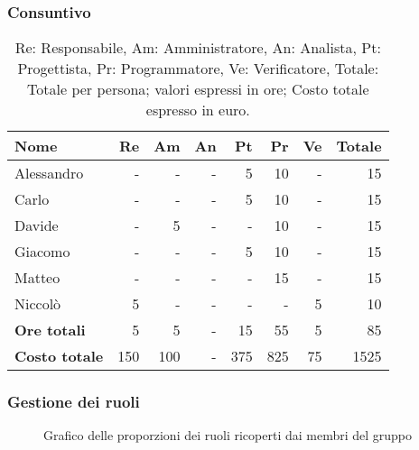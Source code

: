 \subsubsection{Consuntivo}
\begin{table}[H]
	\centering
	\begin{tabular}{l|r|r|r|r|r|r|r}
		\textbf{Nome}         & \textbf{Re} & \textbf{Am} & \textbf{An} & \textbf{Pt} & \textbf{Pr} & \textbf{Ve} & \textbf{Totale} \\
		\hline
		Alessandro            & -           & -           & -           & 5           & 10          & -           & 15              \\
		Carlo                 & -           & -           & -           & 5           & 10          & -           & 15              \\
		Davide                & -           & 5           & -           & -           & 10          & -           & 15              \\
		Giacomo               & -           & -           & -           & 5           & 10          & -           & 15              \\
		Matteo                & -           & -           & -           & -           & 15          & -           & 15              \\
		Niccolò               & 5           & -           & -           & -           & -           & 5           & 10              \\
		\hline
		\textbf{Ore totali}   & 5           & 5           & -           & 15          & 55          & 5           & 85              \\
		\textbf{Costo totale} & 150         & 100         & -           & 375         & 825         & 75          & 1525
	\end{tabular}
	\caption{Re: Responsabile, Am: Amministratore, An: Analista, Pt: Progettista,
		Pr: Programmatore, Ve: Verificatore, Totale: Totale per persona; valori espressi in ore; Costo totale espresso in euro.}
\end{table}

\subsubsection{Gestione dei ruoli}
\begin{figure}[h]
	\centering
	\caption{Grafico delle proporzioni dei ruoli ricoperti dai membri del gruppo}
\end{figure}


